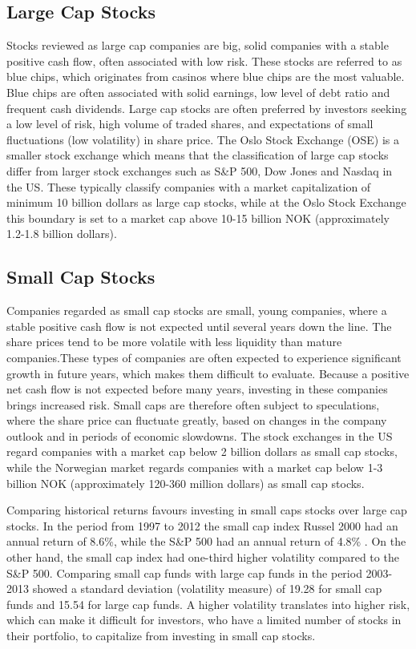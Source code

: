 \subsection{Large Cap Stocks}
Stocks reviewed as large cap companies are big, solid companies with a stable positive cash flow, often associated with low risk. These stocks are referred to as blue chips, which originates from casinos where blue chips are the most valuable. Blue chips are often associated with solid earnings, low level of debt ratio and frequent cash dividends. Large cap stocks are often preferred by investors seeking a low level of risk, high volume of traded shares, and expectations of small fluctuations (low volatility) in share price. The Oslo Stock Exchange (OSE) is a smaller stock exchange which means that the classification of large cap stocks differ from larger stock exchanges such as S\&P 500, Dow Jones and Nasdaq in the US. These typically classify companies with a market capitalization of minimum 10 billion dollars as large cap stocks, while at the Oslo Stock Exchange this boundary is set to a market cap above 10-15 billion NOK (approximately 1.2-1.8 billion dollars). 

\subsection{Small Cap Stocks}
Companies regarded as small cap stocks are small, young companies, where a stable positive cash flow is not expected until several years down the line. The share prices tend to be more volatile with less liquidity than mature companies.These types of companies are often expected to experience significant growth in future years, which makes them difficult to evaluate. Because a positive net cash flow is not expected before many years, investing in these companies brings increased risk. Small caps are therefore often subject to speculations, where the share price can fluctuate greatly, based on changes in the company outlook and in periods of economic slowdowns. The stock exchanges in the US regard companies with a market cap below 2 billion dollars as small cap stocks, while the Norwegian market regards companies with a market cap below 1-3 billion NOK (approximately 120-360 million dollars) as small cap stocks.   

\indent\newline   
Comparing historical returns favours investing in small caps stocks over large cap stocks. In the period from 1997 to 2012 the small cap index Russel 2000 had an annual return of 8.6\%, while the S\&P 500 had an annual return of 4.8\% \cite{segal}. On the other hand, the small cap index had one-third higher volatility compared to the S\&P 500. Comparing small cap funds with large cap funds in the period 2003-2013 showed a standard deviation (volatility measure) of 19.28 for small cap funds and 15.54 for large cap funds. A higher volatility translates into higher risk, which can make it difficult for investors, who have a limited number of stocks in their portfolio, to capitalize from investing in small cap stocks.  

